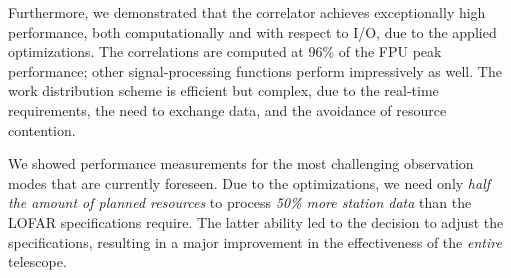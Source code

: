 \documentclass{sig-alternate}
\begin{document}
Furthermore, we demonstrated that the correlator achieves exceptionally high
performance, both computationally and with respect to I/O, due to the applied
optimizations.
The correlations are computed at 96\% of the FPU peak performance; other
signal-processing functions perform impressively as well.
The work distribution scheme is efficient but complex, due to the real-time
requirements, the need to exchange data, and the avoidance of resource
contention.


We showed performance measurements for the most challenging observation modes
that are currently foreseen.
Due to the optimizations, we need only \emph{half the amount of planned
resources\/} to process \emph{50\% more station data\/} than the LOFAR
specifications require.
The latter ability led to the decision to adjust the specifications, resulting
in a major improvement in the effectiveness of the \emph{entire\/} telescope.



\end{document}
